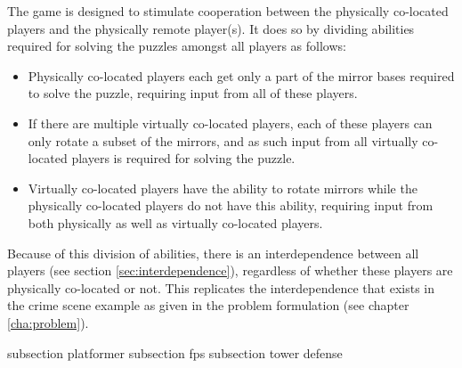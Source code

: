 	The game is designed to stimulate cooperation between the physically 
	co-located players and the physically remote player(s). It does so by 
	dividing abilities required for solving the puzzles amongst all players 
	as follows:
	
	\begin{itemize}
		\item Physically co-located players each get only a part of the 
		      mirror bases required to solve the puzzle, requiring input 
		      from all of these players.
		\item If there are multiple virtually co-located players, each of 
		      these players can only rotate a subset of the mirrors, and 
		      as such input from all virtually co-located players is 
		      required for solving the puzzle. 
		\item Virtually co-located players have the ability to rotate 
		      mirrors while the physically co-located players do not have 
		      this ability, requiring input from both physically as well
		      as virtually co-located players.
	\end{itemize}

	Because of this division of abilities, there is an interdependence 
	between all players (see section \ref{sec:interdependence}), regardless of
	whether these players are physically co-located or not. This replicates the 
	interdependence that exists in the crime scene example as given in the 
	problem formulation (see chapter \ref{cha:problem}).

{subsection platformer}
{subsection fps}
{subsection tower defense}
